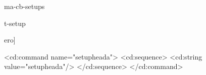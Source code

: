 \startenvironment ma-cb-setups

%

%     

\environment t-setup

\pushmacro\checkdefined
\def\checkdefined#1#2#3{}  %
\loadsetups                %
\popmacro\checkdefined

\startXMLmapping[zero]
\stopXMLmapping

\startXMLmapping[zero]
    \startXMLdata
      <cd:command name="setupheada">
        <cd:sequence>
          <cd:string value="setupheada"/>
        </cd:sequence>
      </cd:command>
    \stopXMLdata
\stopXMLmapping


\unprotect

\setupsetup
  [\c!criterium=\v!used]

\setupframedtexts
  [setuptext]
  [\c!background=SetupAchtergrond,
   \c!offset=15pt,
   \c!frame=\v!off]


\protect

\stopenvironment
